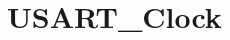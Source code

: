 \hypertarget{group___u_s_a_r_t___clock}{\section{U\-S\-A\-R\-T\-\_\-\-Clock}
\label{group___u_s_a_r_t___clock}
}
